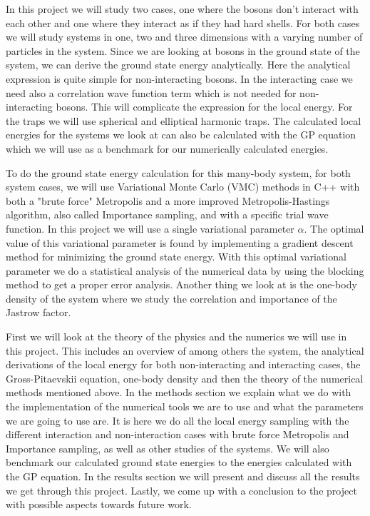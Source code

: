 \documentclass[12pt,a4paper,english]{article}
\begin{document}
In this project we will study two cases, one where the bosons don't interact with each other and one where they interact as if they had hard shells. For both cases we will study systems in one, two and three dimensions with a varying number of particles in the system. Since we are looking at bosons in the ground state of the system, we can derive the ground state energy analytically. Here the analytical expression is quite simple for non-interacting bosons. In the interacting case we need also a correlation wave function term which is not needed for non-interacting bosons. This will complicate the expression for the local energy. For the traps we will use spherical and elliptical harmonic traps. The calculated local energies for the systems we look at can also be calculated with the GP equation which we will use as a benchmark for our numerically calculated energies.

To do the ground state energy calculation for this many-body system, for both system cases, we will use Variational Monte Carlo (VMC) methods in C++ with both a "brute force" Metropolis and a more improved Metropolis-Hastings algorithm, also called Importance sampling, and with a specific trial wave function. In this project we will use a single variational parameter $\alpha$. The optimal value of this variational parameter is found by implementing a gradient descent method for minimizing the ground state energy. With this optimal variational parameter we do a statistical analysis of the numerical data by using the blocking method to get a proper error analysis. Another thing we look at is the one-body density of the system where we study the correlation and importance of the Jastrow factor.

First we will look at the theory of the physics and the numerics we will use in this project. This includes an overview of among others the system, the analytical derivations of the local energy for both non-interacting and interacting cases, the Gross-Pitaevskii equation, one-body density and then the theory of the numerical methods mentioned above. In the methods section we explain what we do with the implementation of the numerical tools we are to use and what the parameters we are going to use are. It is here we do all the local energy sampling with the different interaction and non-interaction cases with brute force Metropolis and Importance sampling, as well as other studies of the systems. We will also benchmark our calculated ground state energies to the energies calculated with the GP equation. In the results section we will present and discuss all the results we get through this project. Lastly, we come up with a conclusion to the project with possible aspects towards future work.
\end{document}
